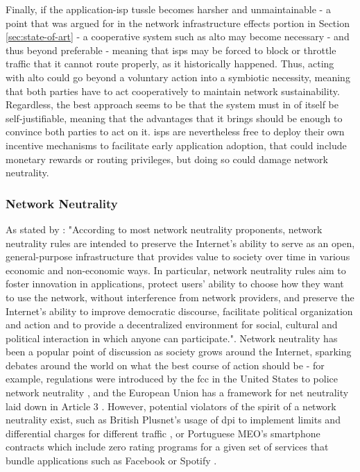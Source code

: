     Finally, if the application-\gls{isp} tussle becomes harsher and unmaintainable - a point that was argued for in the network infrastructure effects portion in Section \ref{sec:state-of-art} - a cooperative system such as \gls{alto} may become necessary - and thus beyond preferable - meaning that \glspl{isp} may be forced to block or throttle traffic that it cannot route properly, as it historically happened.
    Thus, acting with \gls{alto} could go beyond a voluntary action into a symbiotic necessity, meaning that both parties have to act cooperatively to maintain network sustainability.
    Regardless, the best approach seems to be that the system must in of itself be self-justifiable, meaning that the advantages that it brings should be enough to convince both parties to act on it.
    \glspl{isp} are nevertheless free to deploy their own incentive mechanisms to facilitate early application adoption, that could include monetary rewards or routing privileges, but doing so could damage network neutrality.

\subsubsection{Network Neutrality}
    As stated by \cite{qos-framework}: "According to most network neutrality proponents, network neutrality rules are intended to preserve the Internet's ability to serve as an open, general-purpose infrastructure that provides value to society over time in various economic and non-economic ways. In particular, network neutrality rules aim to foster innovation in applications, protect users' ability to choose how they want to use the network, without interference from network providers, and preserve the Internet's ability to improve democratic discourse, facilitate political organization and action and to provide a decentralized environment for social, cultural and political interaction in which anyone can participate.".
    Network neutrality has been a popular point of discussion as society grows around the Internet, sparking debates around the world on what the best course of action should be - for example, regulations were introduced by the \gls{fcc} \cite{fcc} in the United States to police network neutrality \cite{fcc}, and the European Union has a framework for net neutrality laid down in Article 3 \cite{article-3}.
    However, potential violators of the spirit of a network neutrality exist, such as British Plusnet's \cite{plusnet} usage of \gls{dpi} to implement limits and differential charges for different traffic \cite{arstechnica}, or Portuguese MEO's \cite{meo} smartphone contracts which include zero rating programs for a given set of services \cite{meo-packages} that bundle applications such as Facebook \cite{Facebook} or Spotify \cite{spotify}.

